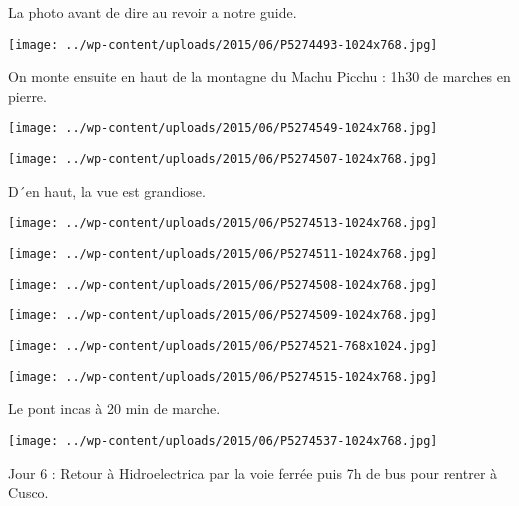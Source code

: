  La photo avant de dire au revoir a notre guide. \newline
 \newline
\centerline{\texttt{[image: ../wp-content/uploads/2015/06/P5274493-1024x768.jpg]} } 
 \newline
 On monte ensuite en haut de la montagne du Machu Picchu : 1h30 de marches en pierre. \newline
 \newline
\centerline{\texttt{[image: ../wp-content/uploads/2015/06/P5274549-1024x768.jpg]} } 
 \newline
 \newline
\centerline{\texttt{[image: ../wp-content/uploads/2015/06/P5274507-1024x768.jpg]} } 
 \newline
 D´en haut, la vue est grandiose. \newline
 \newline
\centerline{\texttt{[image: ../wp-content/uploads/2015/06/P5274513-1024x768.jpg]} } 
 \newline
 \newline
\centerline{\texttt{[image: ../wp-content/uploads/2015/06/P5274511-1024x768.jpg]} } 
 \newline
 \newline
\centerline{\texttt{[image: ../wp-content/uploads/2015/06/P5274508-1024x768.jpg]} } 
 \newline
 \newline
\centerline{\texttt{[image: ../wp-content/uploads/2015/06/P5274509-1024x768.jpg]} } 
 \newline
 \newline
\centerline{\texttt{[image: ../wp-content/uploads/2015/06/P5274521-768x1024.jpg]} } 
 \newline
 \newline
\centerline{\texttt{[image: ../wp-content/uploads/2015/06/P5274515-1024x768.jpg]} } 
 \newline
 Le pont incas à 20 min de marche. \newline
 \newline
\centerline{\texttt{[image: ../wp-content/uploads/2015/06/P5274537-1024x768.jpg]} } 
 \newline
 Jour 6 : \newline
 Retour à Hidroelectrica par la voie ferrée puis 7h de bus pour rentrer à Cusco. \newline

\newpage
 
